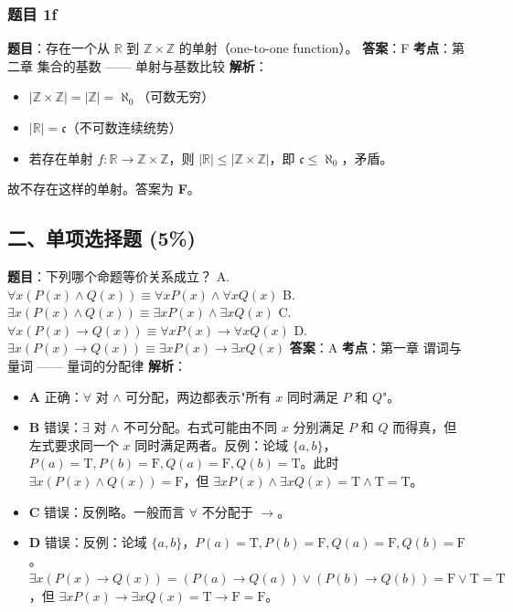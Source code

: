 \documentclass[10pt,a4paper,openany]{ctexbook}
\theoremstyle{definition}
\theoremstyle{remark}
\begin{document}
\subsubsection{题目 1f}

\textbf{题目}：存在一个从 $\mathbb{R}$ 到 $\mathbb{Z} \times \mathbb{Z}$ 的单射（one-to-one function）。
\textbf{答案}：F
\textbf{考点}：第二章 集合的基数 —— 单射与基数比较
\textbf{解析}：
\begin{itemize}
\item $|\mathbb{Z} \times \mathbb{Z}| = |\mathbb{Z}| = \aleph_0$（可数无穷）
\item $|\mathbb{R}| = \mathfrak{c}$（不可数连续统势）
\item 若存在单射 $f: \mathbb{R} \to \mathbb{Z} \times \mathbb{Z}$，则 $|\mathbb{R}| \le |\mathbb{Z} \times \mathbb{Z}|$，即 $\mathfrak{c} \le \aleph_0$，矛盾。

\end{itemize}

故不存在这样的单射。答案为 \textbf{F}。
\vspace{-2pt}

\subsection{二、单项选择题 (5\%)}

\textbf{题目}：下列哪个命题等价关系成立？
A. $\forall x(P(x) \land Q(x)) \equiv \forall x P(x) \land \forall x Q(x)$
B. $\exists x(P(x) \land Q(x)) \equiv \exists x P(x) \land \exists x Q(x)$
C. $\forall x(P(x) \to Q(x)) \equiv \forall x P(x) \to \forall x Q(x)$
D. $\exists x(P(x) \to Q(x)) \equiv \exists x P(x) \to \exists x Q(x)$
\textbf{答案}：A
\textbf{考点}：第一章 谓词与量词 —— 量词的分配律
\textbf{解析}：
\begin{itemize}
\item \textbf{A} 正确：$\forall$ 对 $\land$ 可分配，两边都表示"所有 $x$ 同时满足 $P$ 和 $Q$"。

\item \textbf{B} 错误：$\exists$ 对 $\land$ 不可分配。右式可能由不同 $x$ 分别满足 $P$ 和 $Q$ 而得真，但左式要求同一个 $x$ 同时满足两者。反例：论域 $\{a, b\}$，$P(a)=\mathrm{T}, P(b)=\mathrm{F}, Q(a)=\mathrm{F}, Q(b)=\mathrm{T}$。此时 $\exists x(P(x) \land Q(x)) = \mathrm{F}$，但 $\exists x P(x) \land \exists x Q(x) = \mathrm{T} \land \mathrm{T} = \mathrm{T}$。

\item \textbf{C} 错误：反例略。一般而言 $\forall$ 不分配于 $\to$。

\item \textbf{D} 错误：反例：论域 $\{a, b\}$，$P(a)=\mathrm{T}, P(b)=\mathrm{F}, Q(a)=\mathrm{F}, Q(b)=\mathrm{F}$。$\exists x(P(x) \to Q(x)) = (P(a)\to Q(a)) \lor (P(b)\to Q(b)) = \mathrm{F} \lor \mathrm{T} = \mathrm{T}$，但 $\exists x P(x) \to \exists x Q(x) = \mathrm{T} \to \mathrm{F} = \mathrm{F}$。

\end{itemize}
\end{document}
